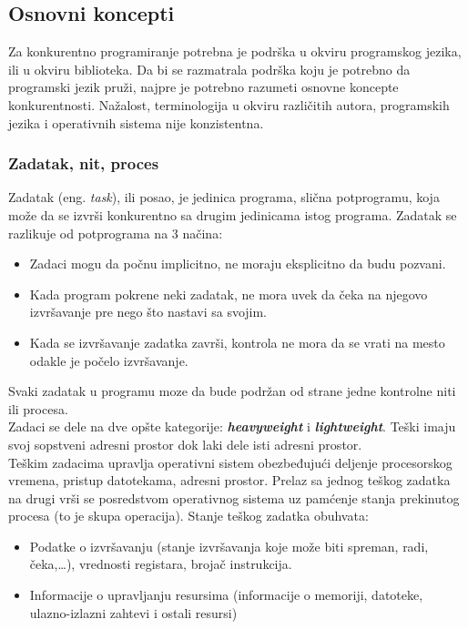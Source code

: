 \documentclass[../main.tex]{subfiles}
\begin{document}
\subsection{Osnovni koncepti}								%

Za konkurentno programiranje potrebna je podrška u okviru programskog jezika, ili u okviru biblioteka. Da bi se razmatrala podrška koju je potrebno da programski jezik pruži, najpre je potrebno razumeti osnovne koncepte konkurentnosti. Nažalost, terminologija u okviru različitih autora, programskih jezika i operativnih sistema nije konzistentna.

\subsubsection{Zadatak, nit, proces}							%

Zadatak (eng. {\it task}), ili posao, je jedinica programa, slična potprogramu, koja može da se izvrši konkurentno sa drugim jedinicama istog programa. Zadatak se razlikuje od potprograma na 3 načina:
\begin{itemize}
\item Zadaci mogu da počnu implicitno, ne moraju eksplicitno da budu pozvani.
\item Kada program pokrene neki zadatak, ne mora uvek da čeka na njegovo izvršavanje pre nego što nastavi sa svojim.
\item Kada se izvršavanje zadatka završi, kontrola ne mora da se vrati na mesto odakle je počelo izvršavanje.
\end{itemize}
Svaki zadatak u programu moze da bude podržan od strane jedne kontrolne niti ili procesa.
\\
Zadaci se dele na dve opšte kategorije: {\it \bf heavyweight} i {\it \bf lightweight}. Teški imaju svoj sopstveni adresni prostor dok laki dele isti adresni prostor.
\\
\indent Teškim zadacima upravlja operativni sistem obezbeđujući deljenje procesorskog vremena, pristup datotekama, adresni prostor. Prelaz sa jednog teškog zadatka na drugi vrši se posredstvom operativnog sistema uz pamćenje stanja prekinutog procesa (to je skupa operacija). Stanje teškog zadatka obuhvata:
\begin{itemize}
\item Podatke o izvršavanju (stanje izvršavanja koje može biti spreman, radi, čeka,\ldots), vrednosti registara, brojač instrukcija.
\item Informacije o upravljanju resursima (informacije o memoriji, datoteke, ulazno-izlazni zahtevi i ostali resursi)
\end{itemize}
\end{document}
